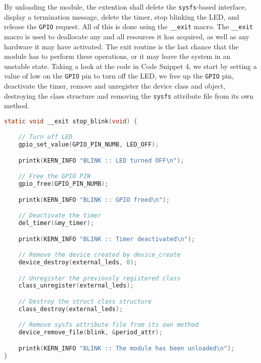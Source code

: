 \documentclass[a4paper,oneside,onecolumn]{article}
\newcommand{\code}[1]{\colorbox{codegray}{\texttt{#1}}}
\begin{document}
By unloading the module, the extention shall delete the \texttt{sysfs}-based interface, display a termination message, delete the timer, stop blinking the LED, and release the \texttt{GPIO} request. All of this is done using the \code{\_\_exit} macro. The \code{\_\_exit} macro is used to deallocate any and all resources it has acquired, as well as any hardware it may have activated. The exit routine is the last chance that the module has to perform these operations, or it may leave the system in an unstable state.
\newline
\newline
Taking a look at the code in Code Snippet 4, we start by setting a value of low on the \texttt{GPIO} pin to turn off the LED, we free up the \texttt{GPIO} pin, deactivate the timer, remove and unregister the device class and object, destroying the class structure and removing the \texttt{sysfs} attribute file from its own method.

\begin{lstlisting}[language=c, label={lst:exit}, caption={Unloading of the Module}]
static void __exit stop_blink(void) {

    // Turn off LED
    gpio_set_value(GPIO_PIN_NUMB, LED_OFF);

    printk(KERN_INFO "BLINK :: LED turned OFF\n");

    // Free the GPIO PIN
    gpio_free(GPIO_PIN_NUMB);

    printk(KERN_INFO "BLINK :: GPIO freed\n");

    // Deactivate the timer
    del_timer(&my_timer);

    printk(KERN_INFO "BLINK :: Timer deactivated\n");

    // Remove the device created by device_create
    device_destroy(external_leds, 0);

    // Unregister the previously registered class
    class_unregister(external_leds);

    // Destroy the struct class structure
    class_destroy(external_leds);

    // Remove sysfs attribute file from its own method
    device_remove_file(blink, &period_attr);

    printk(KERN_INFO "BLINK :: The module has been unloaded\n");
}
\end{lstlisting}
\end{document}
